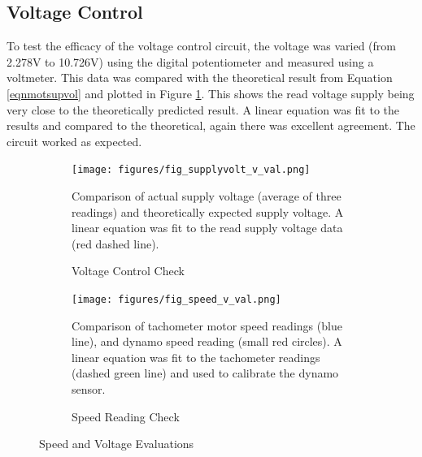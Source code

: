 \documentclass[twoside,a4]{report}
\begin{document}
	\subsection*{Voltage Control}
	To test the efficacy of the voltage control circuit, the voltage was varied (from 2.278V to 10.726V) using the digital potentiometer and measured using a voltmeter. This data was compared with the theoretical result from Equation \ref{eqnmotsupvol} and plotted in Figure \ref{figvoltvval}. This shows the read voltage supply being very close to the theoretically predicted result. A linear equation was fit to the results and compared to the theoretical, again there was excellent agreement. The circuit worked as expected.
	\begin{figure}[!htb]
		\centering
		\begin{subfigure}[t]{0.45\textwidth}
			\centering
			\texttt{[image: figures/fig\_supplyvolt\_v\_val.png]}
			\caption{Voltage Control Check}
			\label{figvoltvval}
			\footnotesize
			Comparison of actual supply voltage (average of three readings) and theoretically expected supply voltage. A linear equation was fit to the read supply voltage data (red dashed line).
		\end{subfigure}
		\begin{subfigure}[t]{0.45\textwidth}
			\centering
			\texttt{[image: figures/fig\_speed\_v\_val.png]}
			\caption{Speed Reading Check}
			\label{figdynocheck}
			\footnotesize
			Comparison of tachometer motor speed readings (blue line), and dynamo speed reading (small red circles). A linear equation was fit to the tachometer readings (dashed green line) and used to calibrate the dynamo sensor.
		\end{subfigure}
		\label{figspeecal}
		\caption{Speed and Voltage Evaluations}
	\end{figure}
\end{document}
